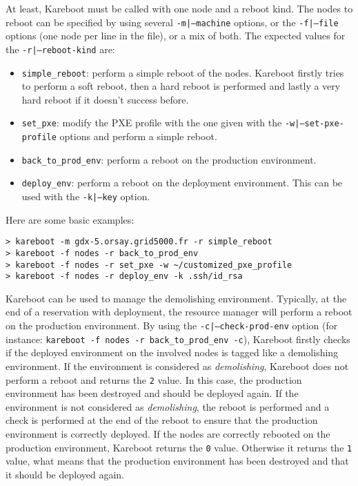 \documentclass[a4wide,10pt,oneside]{book}
\begin{document}
At least, Kareboot must be called with one node and a reboot kind. The nodes to reboot can be specified by using several \texttt{-m|--machine} options, or the \texttt{-f|--file} options (one node per line in the file), or a mix of both. The expected values for the \texttt{-r|--reboot-kind} are:
\begin{itemize}
\item \texttt{simple\_reboot}: perform a simple reboot of the nodes. Kareboot firstly tries to perform a soft reboot, then a hard reboot is performed and lastly a very hard reboot if it doesn't success before.
\item \texttt{set\_pxe}: modify the PXE profile with the one given with the \texttt{-w|--set-pxe-profile} options and perform a simple reboot.
\item \texttt{back\_to\_prod\_env}: perform a reboot on the production environment.
\item \texttt{deploy\_env}: perform a reboot on the deployment environment. This can be used with the \texttt{-k|--key} option.
\end{itemize}

Here are some basic examples:
\begin{verbatim}
> kareboot -m gdx-5.orsay.grid5000.fr -r simple_reboot
> kareboot -f nodes -r back_to_prod_env
> kareboot -f nodes -r set_pxe -w ~/customized_pxe_profile
> kareboot -f nodes -r deploy_env -k .ssh/id_rsa
\end{verbatim}

Kareboot can be used to manage the demolishing environment. Typically, at the end of a reservation with deployment, the resource manager will perform a reboot on the production environment. By using the \texttt{-c|--check-prod-env} option (for instance: \texttt{kareboot -f nodes -r back\_to\_prod\_env -c}), Kareboot firstly checks if the deployed environment on the involved nodes is tagged like a demolishing environment. If the environment is considered as \textit{demolishing}, Kareboot does not perform a reboot and returns the \texttt{2} value. In this case, the production environment has been destroyed and should be deployed again. If the environment is not considered as \textit{demolishing}, the reboot is performed and a check is performed at the end of the reboot to ensure that the production environment is correctly deployed. If the nodes are correctly rebooted on the production environment, Kareboot returns the \texttt{0} value. Otherwise it returns the \texttt{1} value, what means that the production environment has been destroyed and that it should be deployed again.
\end{document}
